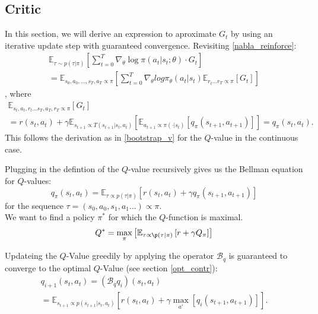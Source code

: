 \subsection{Critic}
In this section, we will derive an expression to aproximate $G_t$ by using an iterative update step with guaranteed convergence.
Revisiting \ref{nabla_reinforce}: 
\begin{equation}
    \begin{aligned}
        \mathbb{E}_{\tau \sim p(\tau | \pi)} \left[ \sum_{t=0}^T \nabla_{\theta} \log \pi(a_t|s_t;\theta) \cdot  G_t\right]\\
        = \mathbb{E}_{s_0, a_0, ... ,s_T, a_T \propto \pi} \left[
            \sum_{t=0}^{T}\nabla_{\theta} log \pi_{\theta}(a_t|s_t) \mathbb{E}_{r_t...r_T \propto \pi} \left[ G_t \right]
        \right]
    \end{aligned}
\end{equation}
, where 
\begin{equation}
    \begin{align}
        \mathbb{E}_{s_t, a_t, r_t...s_T, a_T, r_T \propto \pi} \left[ G_t \right] \\
        = r(s_t,a_t) + \gamma \mathbb{E}_{s_{t+1} \propto T(s_{t+1}|s_t, a_t)}\left[\mathbb{E}_{a_{t+1} \propto \pi(\cdot|s_t)}  \left[q_{\pi}(s_{t+1},a_{t+1})\right]  \right]
        = q_{\pi}(s_{t},a_{t}).
    \end{align}
\end{equation}
This follows the derivation as in \ref{bootstrap_v} for the $Q$-value in the continuous case.

Plugging in the defintion of the $Q$-value recursively gives us the Bellman equation for $Q$-values:
\begin{equation}
q_{\pi}(s_t, a_t) = \mathbb{E}_{\tau \propto p(\tau|\pi)} \left[ r(s_t,a_t) + \gamma q_{\pi}(s_{t+1}, a_{t+1})\right]
\end{equation}
for the sequence $\tau = (s_0,a_0, s_1, a_1...) \propto \pi$.\\
We want to find a policy $\pi^*$ for which the $Q$-function is maximal.
\begin{equation}
    Q^* = \max_{\pi} \left[\mathbb{E}_{\tau \propto \p(\tau|\pi)} \left[ r + \gamma Q_{\pi} \right]\right]
\end{equation}

Updateing the $Q$-Value greedily by applying the operator $\mathcal{B}_q$ is guaranteed to converge to the optimal $Q$-Value (see section \ref{opt_contr}):
\begin{equation}
    \begin{aligned}
        q_{i+1}(s_t, a_t) = (\mathcal{B}_q q_i)(s_t, a_t) \\
        =\mathbb{E}_{s_{t+1} \propto p(s_{t+1}|s_t, a_t)} \left[r(s_t, a_t) + \gamma  \max_{a'} \left[  q_i(s_{t+1}, a_{t + 1}) \right]\right].
    \end{aligned}
\end{equation}

